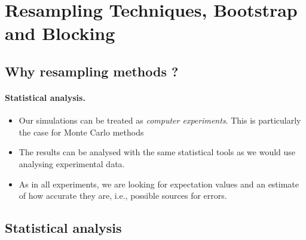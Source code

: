 \documentclass[%
oneside,                 %
final,                   %
10pt]{article}
\begin{document}

\newcommand{\exercisesection}[1]{\subsection*{#1}}



\section*{Resampling Techniques, Bootstrap and Blocking}

\subsection*{Why resampling methods ?}

\paragraph{Statistical analysis.}
\begin{itemize}
    \item Our simulations can be treated as \emph{computer experiments}. This is particularly the case for Monte Carlo methods

    \item The results can be analysed with the same statistical tools as we would use analysing experimental data.

    \item As in all experiments, we are looking for expectation values and an estimate of how accurate they are, i.e., possible sources for errors.
\end{itemize}

\noindent

    

\subsection*{Statistical analysis}

\end{document}
